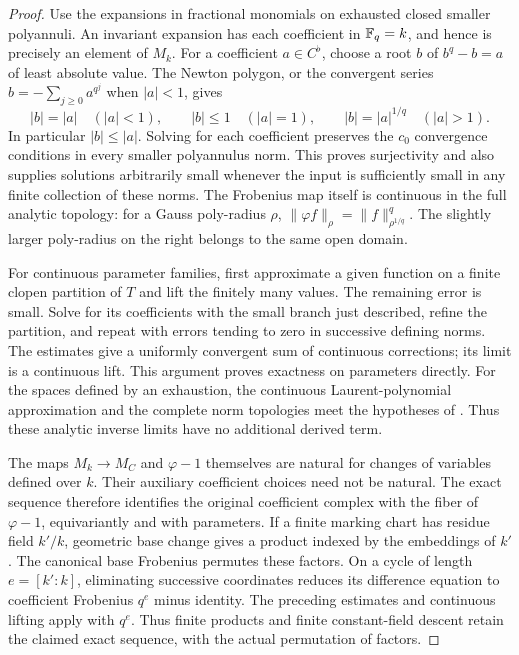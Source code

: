 \begin{proof}
Use the expansions in fractional monomials on exhausted
closed smaller polyannuli.  An invariant expansion has
each coefficient in $\mathbb F_q=k$, and hence is precisely an
element of $M_k$.  For a coefficient $a\in C^\flat$, choose
a root $b$ of $b^q-b=a$ of least absolute value.  The
Newton polygon, or the convergent series
$b=-\sum_{j\geq0}a^{q^j}$ when $|a|<1$, gives
\[
 |b|=|a|\quad (|a|<1),\qquad
 |b|\leq1\quad (|a|=1),\qquad
 |b|=|a|^{1/q}\quad (|a|>1).
\]
In particular $|b|\leq|a|$.  Solving for each coefficient
preserves the $c_0$ convergence conditions in every
smaller polyannulus norm.  This proves surjectivity and
also supplies solutions arbitrarily small whenever the
input is sufficiently small in any finite collection
of these norms.
The Frobenius map itself is continuous in the full analytic
topology: for a Gauss poly-radius $\rho$,
$\|\varphi f\|_\rho=\|f\|_{\rho^{1/q}}^q$.
The slightly larger poly-radius on the right belongs to
the same open domain.

For continuous parameter families, first approximate a
given function on a finite clopen partition of $T$ and
lift the finitely many values.  The remaining error is
small.  Solve for its coefficients with the small
branch just described, refine the partition, and repeat
with errors tending to zero in successive defining
norms.  The estimates give a uniformly convergent sum
of continuous corrections; its limit is a continuous
lift.  This argument proves exactness on parameters
directly.  For the spaces defined by an exhaustion,
the continuous Laurent-polynomial approximation and
the complete norm topologies meet the hypotheses of
.  Thus these analytic inverse
limits have no additional derived term.

The maps $M_k\to M_C$ and $\varphi-1$ themselves are
natural for changes of variables defined over $k$.
Their auxiliary coefficient choices need not be natural.
The exact sequence therefore identifies the original
coefficient complex with the fiber of $\varphi-1$,
equivariantly and with parameters.  If a finite marking
chart has residue field $k'/k$, geometric base change
gives a product indexed by the embeddings of $k'$.
The canonical base Frobenius permutes these factors.
On a cycle of length $e=[k':k]$, eliminating successive
coordinates reduces its difference equation to
coefficient Frobenius $q^e$ minus identity.  The preceding
estimates and continuous lifting apply with $q^e$.
Thus finite products and finite constant-field descent
retain the claimed exact sequence, with the actual
permutation of factors.
\end{proof}

